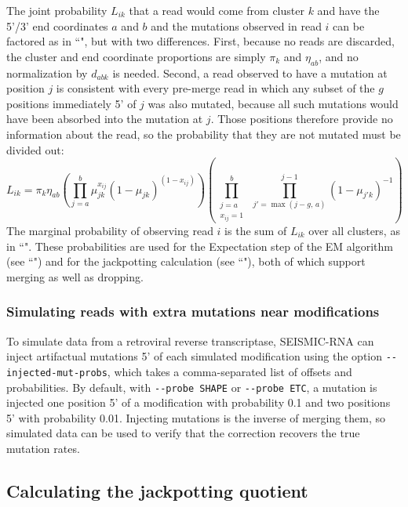 \documentclass{article}
\begin{document}
The joint probability $L_{ik}$ that a read would come from cluster $k$ and have the 5'/3' end coordinates $a$ and $b$ and the mutations observed in read $i$ can be factored as in ``", but with two differences.
First, because no reads are discarded, the cluster and end coordinate proportions are simply $\pi_k$ and $\eta_{ab}$, and no normalization by $d_{abk}$ is needed.
Second, a read observed to have a mutation at position $j$ is consistent with every pre-merge read in which any subset of the $g$ positions immediately 5' of $j$ was also mutated, because all such mutations would have been absorbed into the mutation at $j$.
Those positions therefore provide no information about the read, so the probability that they are not mutated must be divided out:
\begin{equation}
    L_{ik} = \pi_k \eta_{ab} \left(\prod_{j=a}^{b}{\mu_{jk}^{x_{ij}}(1 - \mu_{jk})^{(1 - x_{ij})}}\right) \left(\prod_{\substack{j=a \\ x_{ij}=1}}^{b}{\;\prod_{j'=\max(j-g,\,a)}^{j-1}{(1 - \mu_{j'k})^{-1}}}\right)
\end{equation}
The marginal probability of observing read $i$ is the sum of $L_{ik}$ over all clusters, as in ``".
These probabilities are used for the Expectation step of the EM algorithm (see ``") and for the jackpotting calculation (see ``"), both of which support merging as well as dropping.

\subsubsection{Simulating reads with extra mutations near modifications}

To simulate data from a retroviral reverse transcriptase, SEISMIC-RNA can inject artifactual mutations 5' of each simulated modification using the option \verb|--injected-mut-probs|, which takes a comma-separated list of offsets and probabilities.
By default, with \verb|--probe SHAPE| or \verb|--probe ETC|, a mutation is injected one position 5' of a modification with probability 0.1 and two positions 5' with probability 0.01.
Injecting mutations is the inverse of merging them, so simulated data can be used to verify that the correction recovers the true mutation rates.


\subsection{Calculating the jackpotting quotient}
\label{calc-jackpotting-quotient}
\end{document}
